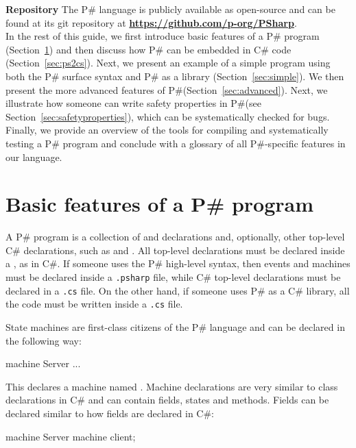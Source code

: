 \documentclass{llncs}
\newcommand{\ps}{P\#\xspace}
\newcommand{\cs}{C\#\xspace}
\newcommand{\newparagraph}[1]{\smallskip\noindent\textbf{#1 }}
\begin{document}
\newparagraph{Repository} The \ps language is publicly available as open-source and can be found at its git repository at \textbf{\url{https://github.com/p-org/PSharp}}.\\

\noindent
In the rest of this guide, we first introduce basic features of a \ps program (Section~\ref{sec:basics}) and then discuss how \ps can be embedded in \cs code (Section~\ref{sec:ps2cs}). Next, we present an example of a simple program using both the \ps surface syntax and \ps as a library (Section~\ref{sec:simple}). We then present the more advanced features of \ps (Section~\ref{sec:advanced}). Next, we illustrate how someone can write safety properties in \ps (see Section~\ref{sec:safetyproperties}), which can be systematically checked for bugs. Finally, we provide an overview of the tools for compiling and systematically testing a \ps program and conclude with a glossary of all \ps-specific features in our language.


\section{Basic features of a \ps program}
\label{sec:basics}

A \ps program is a collection of  and  declarations and, optionally, other top-level \cs declarations, such as  and . All top-level declarations must be declared inside a , as in \cs. If someone uses the \ps high-level syntax, then events and machines must be declared inside a \texttt{.psharp} file, while \cs top-level declarations must be declared in a \texttt{.cs} file. On the other hand, if someone uses \ps as a \cs library, all the code must be written inside a \texttt{.cs} file.

State machines are first-class citizens of the \ps language and can be declared in the following way:

\begin{psharpNoLines}
machine Server { ... }
\end{psharpNoLines}

\noindent
This declares a machine named . Machine declarations are very similar to class declarations in \cs and can contain fields, states and methods. Fields can be declared similar to how fields are declared in \cs:

\begin{psharpNoLines}
machine Server {
  machine client;
}
\end{psharpNoLines}
\end{document}
